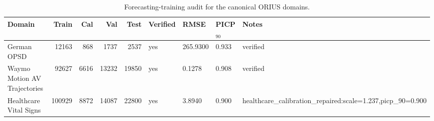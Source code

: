 \begin{table}[htbp]
\centering
\caption{Forecasting-training audit for the canonical ORIUS domains.}
\label{tab:domain-training-audit}
\begin{tabular}{lrrrrllll}
\toprule
Domain & Train & Cal & Val & Test & Verified & RMSE & PICP$_{90}$ & Notes \\
\midrule
German OPSD & 12163 & 868 & 1737 & 2537 & yes & 265.9300 & 0.933 & verified \\
Waymo Motion AV Trajectories & 92627 & 6616 & 13232 & 19850 & yes & 0.1278 & 0.908 & verified \\
Healthcare Vital Signs & 100929 & 8872 & 14087 & 22800 & yes & 3.8940 & 0.900 & healthcare\_calibration\_repaired:scale=1.237,picp\_90=0.900 \\
\bottomrule
\end{tabular}
\end{table}
